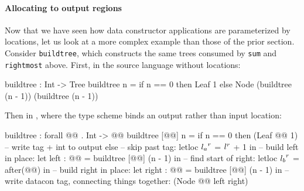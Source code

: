 \documentclass[showabstract,showacknowledgments,showpreface,showdedication]{iuphd}
\theoremstyle{nonumberplain}
\begin{document}
\paragraph{Allocating to output regions}
%
Now that we have seen how data constructor applications are parameterized by
locations, let us look at a more complex example than those of the prior section.
Consider \lstinline[mathescape]{buildtree}, which constructs the same trees consumed by \lstinline[mathescape]{sum}
and \lstinline[mathescape]{rightmost} above.  First, in the source language without locations:

\begin{code}
buildtree : Int -> Tree
buildtree n = if n == 0
              then Leaf 1
              else Node (buildtree (n - 1))
                        (buildtree (n - 1))
\end{code}
%
Then in {\ourcalc}, where the type scheme binds an output rather than input location:
\begin{code}
buildtree : forall @@ . Int -> @@
buildtree [@@] n =
  if n == 0 then (Leaf @@ 1) -- write tag + int to output 
  else -- skip past tag:
       letloc ${l_a}^{r}$ = ${l}^{r}$ + 1 in
       -- build left in place:
       let left : @@ =
           buildtree [@@] (n - 1) in
       -- find start of right:
       letloc ${l_b}^{r}$ = after(@@) in
       -- build right in place:
       let right : @@ =
           buildtree [@@] (n - 1) in
       -- write datacon tag, connecting things together:
       (Node @@ left right)
  \end{code}
\end{document}
